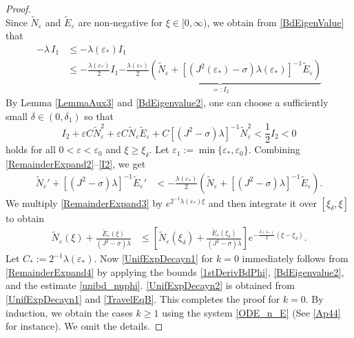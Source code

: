 \documentclass{amsart}
\newcommand{\veps}{\varepsilon}
\numberwithin{equation}{section}
\theoremstyle{plain}%
\theoremstyle{definition}
\theoremstyle{remark}
\theoremstyle{remark}
\begin{document}
\begin{proof}
\begin{equation}
\end{equation}
Since $\widetilde{N}_\veps$ and $\widetilde{E}_\veps$ are non-negative for $\xi \in [0,\infty)$, we obtain from \eqref{BdEigenValue} that
\begin{equation}\label{I1}
\begin{split}
-\lambda \, I_1 
& \leq -\lambda(\veps_\ast)I_1 \\
& \leq -\frac{\lambda(\veps_\ast)}{2}I_1 \underbrace{- \frac{\lambda(\veps_\ast)}{2}\left( \widetilde{N}_\veps + \left[(J^2(\veps_\ast)-\sigma)\lambda(\veps_\ast) \right]^{-1}\widetilde{E}_\veps \right)}_{=:I_2}
\end{split}
\end{equation}
By Lemma \ref{LemmaAux3} and \eqref{BdEigenvalue2}, one can choose a sufficiently small $\delta \in(0,\delta_1)$ so that
\begin{equation}\label{I2}
I_2 +  \veps C \widetilde{N}_\veps^2 + \veps C \widetilde{N}_\veps \widetilde{E}_\veps +C[(J^2-\sigma)\lambda]^{-1} \widetilde{N}_\veps^2 < \frac{1}{2} I_2 <0
\end{equation}
holds for all $0 < \veps < \veps_0$ and $\xi\geq \xi_\delta$.
Let $\veps_1:=\min\{\veps_{\ast},\veps_0\}$. Combining \eqref{RemainderExpand2}--\eqref{I2},
  we get
\begin{equation}\label{RemainderExpand3}
\begin{split}
\widetilde{N}_\veps' + [(J^2-\sigma)\lambda]^{-1}\widetilde{E}_\veps' 
& < -\frac{\lambda(\veps_\ast)}{2}\left( \widetilde{N}_\veps + [(J^2-\sigma)\lambda]^{-1}\widetilde{E}_\veps \right).
\end{split}
\end{equation}
We multiply \eqref{RemainderExpand3} by $e^{2^{-1}\lambda(\veps_\ast)\xi}$ and then integrate it over $[\xi_\delta, \xi]$ to obtain
\begin{equation}\label{RemainderExpand4}
\begin{split}
\widetilde{N}_\veps(\xi) + \frac{\widetilde{E}_\veps(\xi)}{(J^2-\sigma)\lambda}
&  \leq \left[ \widetilde{N}_\veps(\xi_\delta) + \frac{\widetilde{E}_\veps(\xi_\delta)}{(J^2-\sigma)\lambda} \right]e^{-\frac{\lambda(\veps_\ast)}{2}(\xi-\xi_\delta)}.
\end{split}
\end{equation}
Let $C_\ast:=2^{-1}\lambda(\veps_\ast)$. Now \eqref{UnifExpDecayn1} for $k=0$ immediately follows from \eqref{RemainderExpand4} by applying the bounds \eqref{1stDerivBdPhi}, \eqref{BdEigenvalue2}, and the estimate \eqref{unibd_nuphi}. \eqref{UnifExpDecayn2} is obtained from \eqref{UnifExpDecayn1} and \eqref{TravelEqB}. This completes the proof for $k=0$. By induction, we obtain the cases $k\geq  1$ using the system \eqref{ODE_n_E} (See \eqref{Ap44} for instance). We omit the details.
\end{proof}
 
\end{document}
